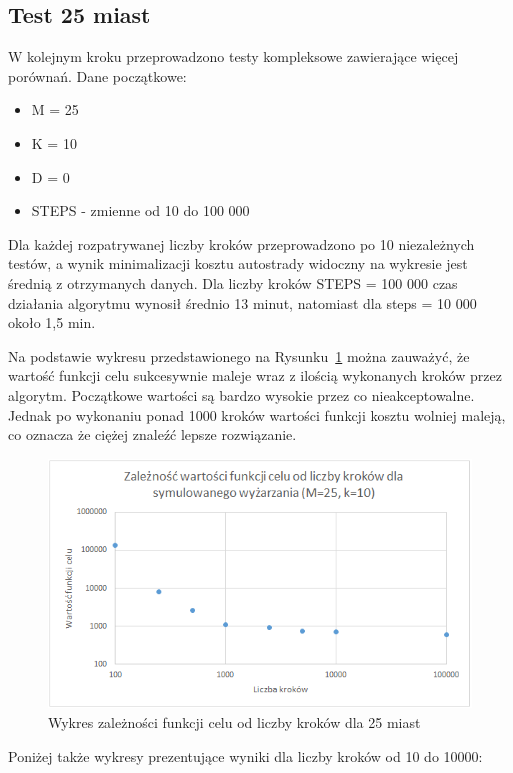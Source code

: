 \documentclass[a4paper]{article}
\begin{document}
\subsection{Test 25 miast}

W kolejnym kroku przeprowadzono testy kompleksowe zawierające więcej porównań. Dane początkowe:
\begin{itemize}
\item M = 25
\item K = 10
\item D = 0
\item STEPS - zmienne od 10 do 100 000
\end{itemize}
Dla każdej rozpatrywanej liczby kroków przeprowadzono po 10 niezależnych testów, a wynik minimalizacji kosztu autostrady widoczny na wykresie jest średnią z otrzymanych danych.
Dla liczby kroków STEPS = 100 000 czas działania algorytmu wynosił średnio 13 minut, natomiast dla steps = 10 000 około 1,5 min.\newline

Na podstawie wykresu przedstawionego na Rysunku~\ref{fig:wyk25} można zauważyć, że wartość funkcji celu sukcesywnie maleje wraz z ilością wykonanych kroków przez algorytm. Początkowe wartości są bardzo wysokie przez co nieakceptowalne. Jednak po wykonaniu ponad 1000 kroków wartości funkcji kosztu wolniej maleją, co oznacza że ciężej znaleźć lepsze rozwiązanie.
\vskip 5cm
\begin{figure}[h!]
\centering
\includegraphics[width=12cm]{25_cities_wykres}
\caption{Wykres zależności funkcji celu od liczby kroków dla 25 miast}
\label{fig:wyk25}
\end{figure}
\vskip 1cm

Poniżej także wykresy prezentujące wyniki dla liczby kroków od 10 do 10000:
\end{document}
